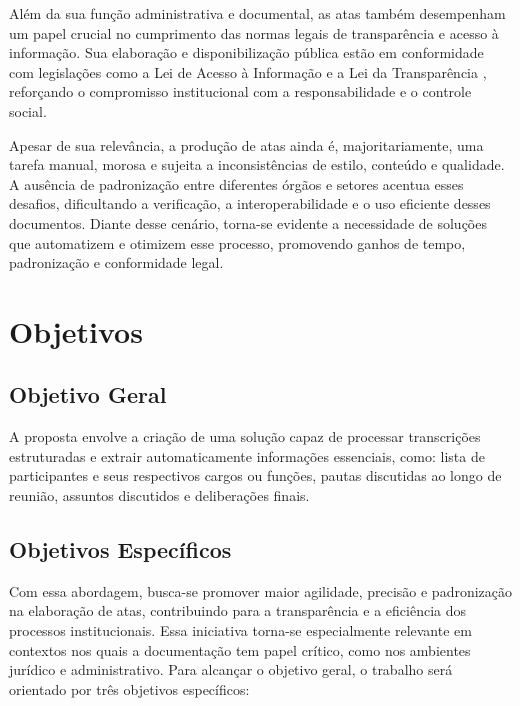 Além da sua função administrativa e documental, as atas também desempenham um papel crucial no cumprimento das normas legais de transparência e acesso à informação. Sua elaboração e disponibilização pública estão em conformidade com legislações como a Lei de Acesso à Informação \cite{brasil_lei_2011} e a Lei da Transparência \cite{brasil_lei_2009}, reforçando o compromisso institucional com a responsabilidade e o controle social.

Apesar de sua relevância, a produção de atas ainda é, majoritariamente, uma tarefa manual, morosa e sujeita a inconsistências de estilo, conteúdo e qualidade. A ausência de padronização entre diferentes órgãos e setores acentua esses desafios, dificultando a verificação, a interoperabilidade e o uso eficiente desses documentos. Diante desse cenário, torna-se evidente a necessidade de soluções que automatizem e otimizem esse processo, promovendo ganhos de tempo, padronização e conformidade legal.

\section{Objetivos}

\label{sec:objetivos}



\subsection{Objetivo Geral}
\label{sec:objetivo-geral}

A proposta envolve a criação de uma solução capaz de processar transcrições estruturadas e extrair automaticamente informações essenciais, como: lista de participantes e seus respectivos cargos ou funções, pautas discutidas ao longo de reunião, assuntos discutidos e deliberações finais.

\subsection{Objetivos Específicos}
\label{sec:objetivos-especificos}

Com essa abordagem, busca-se promover maior agilidade, precisão e padronização na elaboração de atas, contribuindo para a transparência e a eficiência dos processos institucionais. Essa iniciativa torna-se especialmente relevante em contextos nos quais a documentação tem papel crítico, como nos ambientes jurídico e administrativo. Para alcançar o objetivo geral, o trabalho será orientado por três objetivos específicos: 


